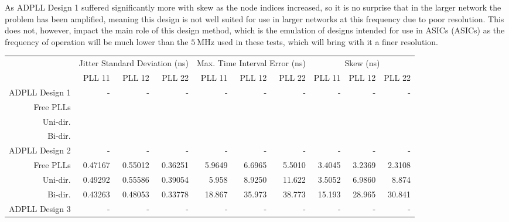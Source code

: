 As \ac{ADPLL} Design 1 suffered significantly more with skew as the node indices increased, so it is no surprise that in the larger network the problem has been amplified, meaning this design is not well suited for use in larger networks at this frequency due to poor resolution. This does not, however, impact the main role of this design method, which is the emulation of designs intended for use in \aclp{ASIC} (\acsp{ASIC}) as the frequency of operation will be much lower than the $5~\si{\mega\hertz}$ used in these tests, which will bring with it a finer resolution.
\begin{table}[!ht]
    \begin{center}
        \begin{footnotesize}
            \setlength{\tabcolsep}{.9\tabcolsep}
            \begin{tabular}{ll|r|r|r|r|r|r|r|r|r|}           
                \cline{3-11}
                && \multicolumn{3}{c|}{Jitter Standard Deviation (ns)} & \multicolumn{3}{c|}{Max. Time Interval Error (ns)} & \multicolumn{3}{c|}{Skew (ns)} \T\\
                \cline{3-11} 
                &&PLL 11&PLL 12&PLL 22    &PLL 11&PLL 12&PLL 22    &PLL 11&PLL 12&PLL 22\T\\
                \hline
                \multicolumn{2}{|l|}{\ac{ADPLL} Design 1}&-&-&-&-&-&-&-&-&-\T\\
                \multicolumn{2}{|r|}{Free PLLs} &&& &&& &&& \T\\
                \multicolumn{2}{|r|}{Uni-dir.}  &&& &&& &&& \T\\
                \multicolumn{2}{|r|}{Bi-dir.}   &&& &&& &&& \T\\
                \hline
                \multicolumn{2}{|l|}{\ac{ADPLL} Design 2}&-&-&-&-&-&-&-&-&-\T\\
                \multicolumn{2}{|r|}{Free PLLs} &0.47167 &0.55012 &0.36251    &5.9649 &6.6965 &5.5010    &3.4045&3.2369&2.3108 \T\\
                \multicolumn{2}{|r|}{Uni-dir.}  &0.49292 &0.55586 &0.39054    &5.958  &8.9250 &11.622    &3.5052&6.9860&8.874 \T\\
                \multicolumn{2}{|r|}{Bi-dir.}   &0.43263 &0.48053 &0.33778    &18.867 &35.973 &38.773    &15.193&28.965&30.841 \T\\
                \hline
                \multicolumn{2}{|l|}{\ac{ADPLL} Design 3}&-&-&-&-&-&-&-&-&-\T\\

\end{tabular}
\end{footnotesize}
\end{center}
\end{table}
